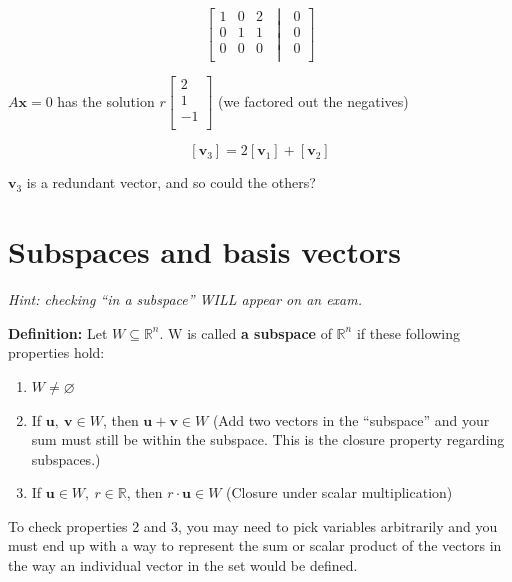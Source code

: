 \documentclass[12pt]{article}
\theoremstyle{plain}
\theoremstyle{remark}
\theoremstyle{definition}
\begin{document}
\[\left\lbrack \begin{matrix}
1 & 0 & 2 \\
0 & 1 & 1 \\
0 & 0 & 0 \\
\end{matrix}\;\middle|\;\begin{matrix}
0 \\
0 \\
0 \\
\end{matrix} \right\rbrack\]

\(A\mathbf{x} = 0\) has the solution \(r\begin{bmatrix}
2 \\
1 \\
 - 1 \\
\end{bmatrix}\) (we factored out the negatives)

\[\left\lbrack {\mathbf{v}}_{3} \right\rbrack = 2\left\lbrack {\mathbf{v}}_{1} \right\rbrack + \left\lbrack {\mathbf{v}}_{2} \right\rbrack\]

\({\mathbf{v}}_{3}\) is a redundant vector, and so could the others?


\section{Subspaces and basis
vectors}

\emph{Hint: checking ``in a subspace'' WILL appear on an exam.}

\textbf{Definition:} Let \(W \subseteq \mathbb{R}^{n}\text{.\ W}\) is
called \textbf{a subspace} of \(\mathbb{R}^{n}\) if these following
properties hold:

\begin{enumerate}
\def\labelenumi{\arabic{enumi}.}
\item
  \(W \neq \varnothing\)
\item
  If \(\mathbf{u},\ \mathbf{v} \in W\), then
  \(\mathbf{u} + \mathbf{v} \in W\) (Add two vectors in the
  ``subspace'' and your sum must still be within the subspace. This is
  the closure property regarding subspaces.)
\item
  If \(\mathbf{u} \in W,\ r\mathbb{\in R}\), then
  \(r \cdot \mathbf{u} \in W\) (Closure under scalar multiplication)
\end{enumerate}

To check properties 2 and 3, you may need to pick variables arbitrarily
and you must end up with a way to represent the sum or scalar product of
the vectors in the way an individual vector in the set would be defined.
\end{document}
